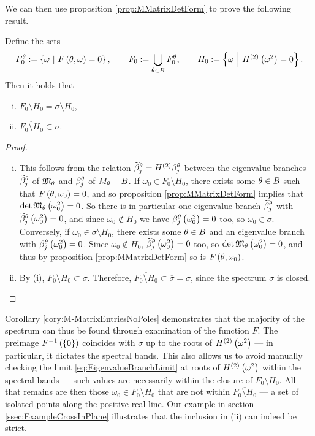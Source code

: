 We can then use proposition \ref{prop:MMatrixDetForm} to prove the following result.
\begin{cory} \label{cory:ScalarSetInclusions}
	Define the sets
	\begin{align*}
		F_0^{\theta} := \left\{ \omega \ \middle\vert \  F\left( \theta, \omega \right)=0 \right\},
		\qquad
		F_0 := \bigcup_{\theta\in B}F_0^{\theta},
		\qquad
		H_0 := \left\{ \omega \ \middle\vert \  H^{(2)}\left( \omega^2 \right)=0 \right\}.
	\end{align*}		
	Then it holds that
	\begin{enumerate}[(i)]
		\item $F_0\setminus H_0 = \sigma\setminus H_0$,
		\item $\overline{F_0\setminus H_0} \subset \sigma$.
	\end{enumerate}
\end{cory}
\begin{proof}
	\begin{enumerate}[(i)]
		\item This follows from the relation $\widetilde{\beta}_j^{\theta} = H^{(2)}\beta_j^\theta$ between the eigenvalue branches $\widetilde{\beta}_j^{\theta}$ of $\mathfrak{M}_{\theta}$ and $\beta_j^{\theta}$ of $M_{\theta}-B$.
		If $\omega_0\in F_0\setminus H_0$, there exists some $\theta\in B$ such that $F\left( \theta,\omega_0 \right)=0$, and so proposition \ref{prop:MMatrixDetForm} implies that $\det\mathfrak{M}_\theta\left( \omega_0^2 \right)=0$.
		So there is in particular one eigenvalue branch $\widetilde{\beta}_j^{\theta}$ with $\widetilde{\beta}_j^{\theta}\left( \omega_0^2 \right)=0$, and since $\omega_0\not\in H_0$ we have $\beta_j^\theta\left( \omega_0^2 \right)=0$ too, so $\omega_0\in\sigma$.
		Conversely, if $\omega_0\in \sigma\setminus H_0$, there exists some $\theta\in B$ and an eigenvalue branch with $\beta_j^\theta\left( \omega_0^2 \right)=0$.
		Since $\omega_0\not\in H_0$, $\widetilde{\beta}_j^{\theta}\left( \omega_0^2 \right)=0$ too, so $\det\mathfrak{M}_{\theta}\left( \omega_0^2 \right)=0$, and thus by proposition \ref{prop:MMatrixDetForm} so is $F\left( \theta,\omega_0 \right)$.
		\item By (i), $F_0\setminus H_0 \subset \sigma$.
		Therefore, $\overline{F_0\setminus H_0}\subset\overline{\sigma}=\sigma$, since the spectrum $\sigma$ is closed.
	\end{enumerate}
\end{proof}
Corollary \ref{cory:M-MatrixEntriesNoPoles} demonstrates that the majority of the spectrum can thus be found through examination of the function $F$.
The preimage $F^{-1}\left( \left\{ 0 \right\} \right)$ coincides with $\sigma$ up to the roots of $H^{(2)}\left( \omega^2 \right)$ --- in particular, it dictates the spectral bands.
This also allows us to avoid manually checking the limit \eqref{eq:EigenvalueBranchLimit} at roots of $H^{(2)}\left( \omega^2 \right)$ within the spectral bands --- such values are necessarily within the closure of $F_0\setminus H_0$.
All that remains are then those $\omega_0\in F_0\setminus H_0$ that are not within $\overline{F_0\setminus H_0}$ --- a set of isolated points along the positive real line.
Our example in section \ref{ssec:ExampleCrossInPlane} illustrates that the inclusion in (ii) can indeed be strict.

